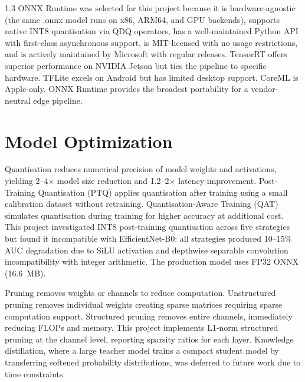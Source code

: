 \begin{spacing}{1.3}
ONNX Runtime was selected for this project because it is hardware-agnostic (the same .onnx model runs on x86, ARM64, and GPU backends), supports native INT8 quantisation via QDQ operators, has a well-maintained Python API with first-class asynchronous support, is MIT-licensed with no usage restrictions, and is actively maintained by Microsoft with regular releases. TensorRT offers superior performance on NVIDIA Jetson but ties the pipeline to specific hardware. TFLite excels on Android but has limited desktop support. CoreML is Apple-only. ONNX Runtime provides the broadest portability for a vendor-neutral edge pipeline.

\section{Model Optimization}

Quantisation reduces numerical precision of model weights and activations, yielding 2--4$\times$ model size reduction and 1.2--2$\times$ latency improvement. Post-Training Quantisation (PTQ) applies quantisation after training using a small calibration dataset without retraining. Quantisation-Aware Training (QAT) simulates quantisation during training for higher accuracy at additional cost. This project investigated INT8 post-training quantisation across five strategies but found it incompatible with EfficientNet-B0: all strategies produced 10--15\% AUC degradation due to SiLU activation and depthwise separable convolution incompatibility with integer arithmetic. The production model uses FP32 ONNX (16.6~MB).

Pruning removes weights or channels to reduce computation. Unstructured pruning removes individual weights creating sparse matrices requiring sparse computation support. Structured pruning removes entire channels, immediately reducing FLOPs and memory. This project implements L1-norm structured pruning at the channel level, reporting sparsity ratios for each layer. Knowledge distillation, where a large teacher model trains a compact student model by transferring softened probability distributions, was deferred to future work due to time constraints.

\end{spacing}

